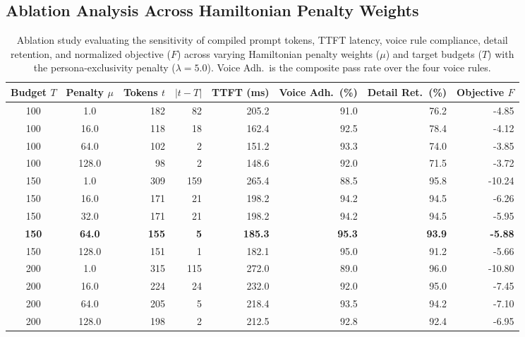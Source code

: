 \documentclass[review,12pt,times,authoryear]{elsarticle}
\theoremstyle{definition}
\begin{document}
\subsection{Ablation Analysis Across Hamiltonian Penalty Weights}

\begin{table}[t]
\centering
\small
\setlength{\tabcolsep}{3.5pt}
\renewcommand{\arraystretch}{1.12}
\caption{Ablation study evaluating the sensitivity of compiled prompt tokens, TTFT latency, voice rule compliance, detail retention, and normalized objective ($F$) across varying Hamiltonian penalty weights ($\mu$) and target budgets ($T$) with the persona-exclusivity penalty ($\lambda = 5.0$). Voice Adh.\ is the composite pass rate over the four voice rules.}
\label{tab:ablation}
\begin{tabular*}{\textwidth}{@{\extracolsep{\fill}}ccrrrrrr@{}}
\toprule
\textbf{Budget $T$} & \textbf{Penalty $\mu$} & \textbf{Tokens $t$} & \textbf{$|t - T|$} & \textbf{TTFT (ms)} & \textbf{Voice Adh.\ (\%)} & \textbf{Detail Ret.\ (\%)} & \textbf{Objective $F$} \\
\midrule
100 & 1.0  & 182 & 82 & 205.2 & 91.0 & 76.2 & -4.85 \\
100 & 16.0 & 118 & 18 & 162.4 & 92.5 & 78.4 & -4.12 \\
100 & 64.0 & 102 &  2 & 151.2 & 93.3 & 74.0 & -3.85 \\
100 & 128.0&  98 &  2 & 148.6 & 92.0 & 71.5 & -3.72 \\
\midrule[0.5pt]
150 & 1.0  & 309 & 159 & 265.4 & 88.5 & 95.8 & -10.24 \\
150 & 16.0 & 171 &  21 & 198.2 & 94.2 & 94.5 & -6.26 \\
150 & 32.0 & 171 &  21 & 198.2 & 94.2 & 94.5 & -5.95 \\
\textbf{150} & \textbf{64.0} & \textbf{155} & \textbf{5} & \textbf{185.3} & \textbf{95.3} & \textbf{93.9} & \textbf{-5.88} \\
150 & 128.0& 151 &   1 & 182.1 & 95.0 & 91.2 & -5.66 \\
\midrule[0.5pt]
200 & 1.0  & 315 & 115 & 272.0 & 89.0 & 96.0 & -10.80 \\
200 & 16.0 & 224 &  24 & 232.0 & 92.0 & 95.0 & -7.45 \\
200 & 64.0 & 205 &   5 & 218.4 & 93.5 & 94.2 & -7.10 \\
200 & 128.0& 198 &   2 & 212.5 & 92.8 & 92.4 & -6.95 \\
\bottomrule
\end{tabular*}
\end{table}
\end{document}

